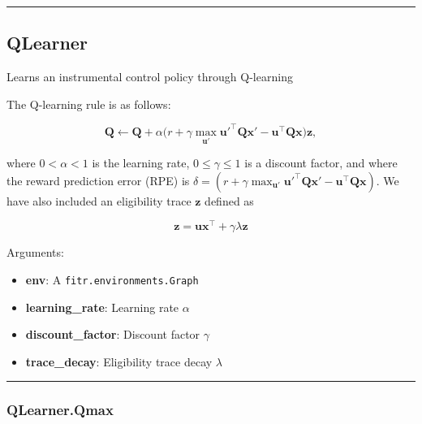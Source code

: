 \begin{center}\rule{0.5\linewidth}{\linethickness}\end{center}

\hypertarget{qlearner}{%
\subsection{QLearner}\label{qlearner}}

\begin{Shaded}
\begin{Highlighting}[]
\end{Highlighting}
\end{Shaded}

Learns an instrumental control policy through Q-learning

The Q-learning rule is as follows:

\[
\mathbf Q \gets \mathbf Q + \alpha \big(r + \gamma \max_{\mathbf u'} \mathbf u'^\top \mathbf Q \mathbf x' - \mathbf u^\top \mathbf Q \mathbf x \big) \mathbf z,
\]

where \(0 < \alpha < 1\) is the learning rate, \(0 \leq \gamma \leq 1\)
is a discount factor, and where the reward prediction error (RPE) is
\(\delta = (r + \gamma \max_{\mathbf u'} \mathbf u'^\top \mathbf Q \mathbf x' - \mathbf u^\top \mathbf Q \mathbf x)\).
We have also included an eligibility trace \(\mathbf z\) defined as

\[
\mathbf z = \mathbf u \mathbf x^\top +  \gamma \lambda \mathbf z
\]

Arguments:

\begin{itemize}
\tightlist
\item
  \textbf{env}: A \texttt{fitr.environments.Graph}
\item
  \textbf{learning\_rate}: Learning rate \(\alpha\)
\item
  \textbf{discount\_factor}: Discount factor \(\gamma\)
\item
  \textbf{trace\_decay}: Eligibility trace decay \(\lambda\)
\end{itemize}

\begin{center}\rule{0.5\linewidth}{\linethickness}\end{center}

\hypertarget{qlearner.qmax}{%
\subsubsection{QLearner.Qmax}\label{qlearner.qmax}}

